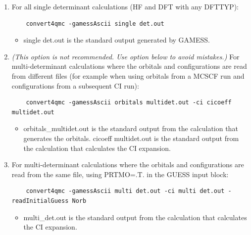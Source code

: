 \begin{enumerate}
  \item{For all single determinant calculations (HF and DFT with any DFTTYP):}
  \begin{shaded}
  \begin{verbatim}
    convert4qmc -gamessAscii single det.out
  \end{verbatim}
  \end{shaded}
  \begin{itemize}
    \item{single det.out is the standard output generated by GAMESS.}
  \end{itemize}
  \item{\textit{(This option is not recommended. Use option below to avoid mistakes.)} For 
    multi-determinant calculations where the orbitals and configurations are read from different
    files (for example when using orbitals from a MCSCF run and configurations from a
    subsequent CI run):}
  \begin{shaded}
  \begin{verbatim}
    convert4qmc -gamessAscii orbitals multidet.out -ci cicoeff multidet.out
  \end{verbatim}
  \end{shaded}
  \begin{itemize}
    \item{orbitals\_multidet.out is the standard output from the calculation that generates the
       orbitals. cicoeff multidet.out is the standard output from the calculation that calculates 
       the CI expansion.}
  \end{itemize}
  \item{For multi-determinant calculations where the orbitals and configurations are read from
    the same file, using PRTMO=.T. in the GUESS input block:}
  \begin{shaded}
  \begin{verbatim}
    convert4qmc -gamessAscii multi det.out -ci multi det.out -readInitialGuess Norb
  \end{verbatim}
  \end{shaded}
  \begin{itemize}
    \item{multi\_det.out is the standard output from the calculation that calculates the CI expansion.}
  \end{itemize}
\end{enumerate}

